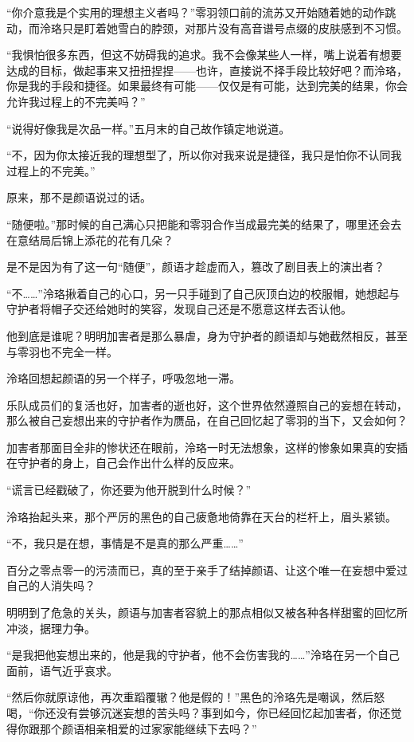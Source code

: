 \documentclass[UTF8, scheme = chinese, openany]{ctexbook}
\begin{document}
“你介意我是个实用的理想主义者吗？”零羽领口前的流苏又开始随着她的动作跳动，而泠珞只是盯着她雪白的脖颈，对那片没有高音谱号点缀的皮肤感到不习惯。

“我惧怕很多东西，但这不妨碍我的追求。我不会像某些人一样，嘴上说着有想要达成的目标，做起事来又扭扭捏捏——也许，直接说不择手段比较好吧？而泠珞，你是我的手段和捷径。如果最终有可能——仅仅是有可能，达到完美的结果，你会允许我过程上的不完美吗？”

“说得好像我是次品一样。”五月末的自己故作镇定地说道。

“不，因为你太接近我的理想型了，所以你对我来说是捷径，我只是怕你不认同我过程上的不完美。”

原来，那不是颜语说过的话。

“随便啦。”那时候的自己满心只把能和零羽合作当成最完美的结果了，哪里还会去在意结局后锦上添花的花有几朵？

是不是因为有了这一句“随便”，颜语才趁虚而入，篡改了剧目表上的演出者？

“不……”泠珞揪着自己的心口，另一只手碰到了自己灰顶白边的校服帽，她想起与守护者将帽子交还给她时的笑容，发现自己还是不愿意这样去否认他。

他到底是谁呢？明明加害者是那么暴虐，身为守护者的颜语却与她截然相反，甚至与零羽也不完全一样。

泠珞回想起颜语的另一个样子，呼吸忽地一滞。

乐队成员们的复活也好，加害者的逝也好，这个世界依然遵照自己的妄想在转动，那么被自己妄想出来的守护者作为赝品，在自己回忆起了零羽的当下，又会如何？

加害者那面目全非的惨状还在眼前，泠珞一时无法想象，这样的惨象如果真的安插在守护者的身上，自己会作出什么样的反应来。

“谎言已经戳破了，你还要为他开脱到什么时候？”

泠珞抬起头来，那个严厉的黑色的自己疲惫地倚靠在天台的栏杆上，眉头紧锁。

“不，我只是在想，事情是不是真的那么严重……”

百分之零点零一的污渍而已，真的至于亲手了结掉颜语、让这个唯一在妄想中爱过自己的人消失吗？

明明到了危急的关头，颜语与加害者容貌上的那点相似又被各种各样甜蜜的回忆所冲淡，据理力争。

“是我把他妄想出来的，他是我的守护者，他不会伤害我的……”泠珞在另一个自己面前，语气近乎哀求。

“然后你就原谅他，再次重蹈覆辙？他是假的！”黑色的泠珞先是嘲讽，然后怒喝，“你还没有尝够沉迷妄想的苦头吗？事到如今，你已经回忆起加害者，你还觉得你跟那个颜语相亲相爱的过家家能继续下去吗？”
\end{document}
